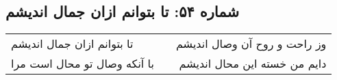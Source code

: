 \begin{center}
\section*{شماره ۵۴: تا بتوانم ازان جمال اندیشم}
\label{sec:054}
\begin{longtable}{l p{0.5cm} r}
تا بتوانم ازان جمال اندیشم
&&
وز راحت و روح آن وصال اندیشم
\\
با آنکه وصال تو محال است مرا
&&
دایم من خسته این محال اندیشم
\\
\end{longtable}
\end{center}
